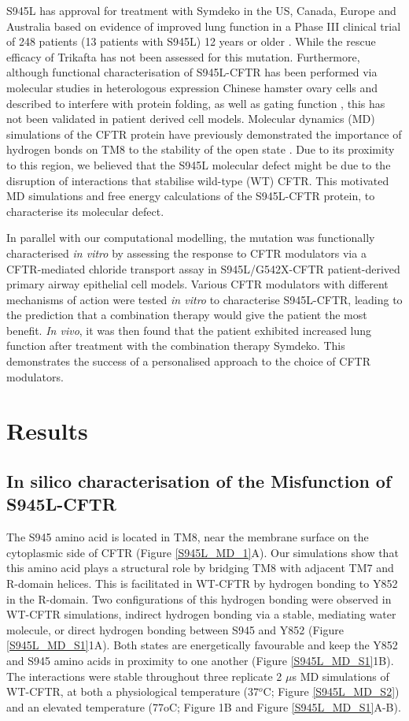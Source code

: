 S945L has approval for treatment with Symdeko in the US, Canada, Europe and Australia based on evidence of improved lung function in a Phase III clinical trial of 248 patients (13 patients with S945L) 12 years or older \cite{rowe2017}. While the rescue efficacy of Trikafta has not been assessed for this mutation. Furthermore, although functional characterisation of S945L-CFTR has been performed via molecular studies in heterologous expression Chinese hamster ovary cells and described to interfere with protein folding, as well as gating function \cite{seibert1996}, this has not been validated in patient derived cell models. Molecular dynamics (MD) simulations of the CFTR protein have previously demonstrated the importance of hydrogen bonds on TM8 to the stability of the open state \cite{corradi2018}. Due to its proximity to this region, we believed that the S945L molecular defect might be due to the disruption of interactions that stabilise wild-type (WT) CFTR. This motivated MD simulations and free energy calculations of the S945L-CFTR protein, to characterise its molecular defect.

In parallel with our computational modelling, the mutation was functionally characterised \textit{in vitro} by assessing the response to CFTR modulators via a CFTR-mediated chloride transport assay in S945L/G542X-CFTR patient-derived primary airway epithelial cell models. Various CFTR modulators with different mechanisms of action were tested \textit{in vitro} to characterise S945L-CFTR, leading to the prediction that a combination therapy would give the patient the most benefit. \textit{In vivo}, it was then found that the patient exhibited increased lung function after treatment with the combination therapy Symdeko. This demonstrates the success of a personalised approach to the choice of CFTR modulators. 

\section{Results}

\subsection{In silico characterisation of the Misfunction of S945L-CFTR}
The S945 amino acid is located in TM8, near the membrane surface on the cytoplasmic side of CFTR (Figure \ref{S945L_MD_1}A). Our simulations show that this amino acid plays a structural role by bridging TM8 with adjacent TM7 and R-domain helices. This is facilitated in WT-CFTR by hydrogen bonding to Y852 in the R-domain. Two configurations of this hydrogen bonding were observed in WT-CFTR simulations, indirect hydrogen bonding via a stable, mediating water molecule, or direct hydrogen bonding between S945 and Y852 (Figure \ref{S945L_MD_S1}1A). Both states are energetically favourable and keep the Y852 and S945 amino acids in proximity to one another (Figure \ref{S945L_MD_S1}1B). The interactions were stable throughout three replicate 2 $\mu$s MD simulations of WT-CFTR, at both a physiological temperature (37$^o$C; Figure \ref{S945L_MD_S2}) and an elevated temperature (77oC; Figure 1B and Figure \ref{S945L_MD_S1}A-B). 

